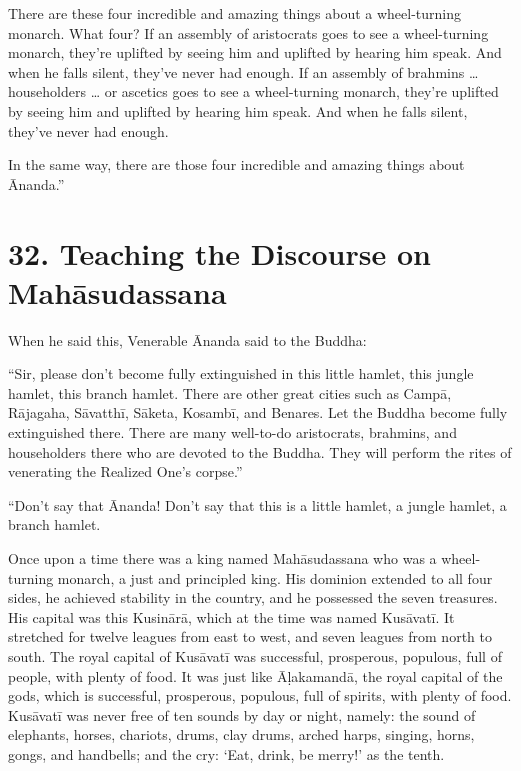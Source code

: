 \documentclass[12pt,openany]{book}%
\begin{document}
There are these four incredible and amazing things about a wheel-turning monarch. What four? If an assembly of aristocrats goes to see a wheel-turning monarch, they’re uplifted by seeing him and uplifted by hearing him speak. And when he falls silent, they’ve never had enough. If an assembly of brahmins … householders … or ascetics goes to see a wheel-turning monarch, they’re uplifted by seeing him and uplifted by hearing him speak. And when he falls silent, they’ve never had enough. 

In the same way, there are those four incredible and amazing things about Ānanda.” 

\section*{32. Teaching the Discourse on \textsanskrit{Mahāsudassana} }

When he said this, Venerable Ānanda said to the Buddha: 

“Sir, please don’t become fully extinguished in this little hamlet, this jungle hamlet, this branch hamlet. There are other great cities such as \textsanskrit{Campā}, \textsanskrit{Rājagaha}, \textsanskrit{Sāvatthī}, \textsanskrit{Sāketa}, \textsanskrit{Kosambī}, and Benares. Let the Buddha become fully extinguished there. There are many well-to-do aristocrats, brahmins, and householders there who are devoted to the Buddha. They will perform the rites of venerating the Realized One’s corpse.” 

“Don’t say that Ānanda! Don’t say that this is a little hamlet, a jungle hamlet, a branch hamlet. 

Once upon a time there was a king named \textsanskrit{Mahāsudassana} who was a wheel-turning monarch, a just and principled king. His dominion extended to all four sides, he achieved stability in the country, and he possessed the seven treasures. His capital was this \textsanskrit{Kusinārā}, which at the time was named \textsanskrit{Kusāvatī}. It stretched for twelve leagues from east to west, and seven leagues from north to south. The royal capital of \textsanskrit{Kusāvatī} was successful, prosperous, populous, full of people, with plenty of food. It was just like \textsanskrit{Āḷakamandā}, the royal capital of the gods, which is successful, prosperous, populous, full of spirits, with plenty of food. \textsanskrit{Kusāvatī} was never free of ten sounds by day or night, namely: the sound of elephants, horses, chariots, drums, clay drums, arched harps, singing, horns, gongs, and handbells; and the cry: ‘Eat, drink, be merry!’ as the tenth. 
\end{document}
